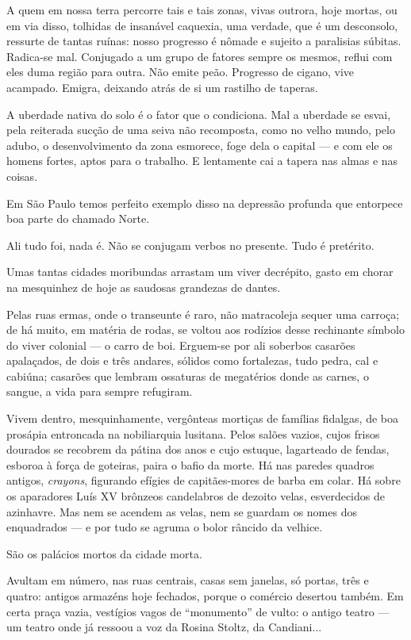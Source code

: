 A quem em nossa terra percorre tais e tais zonas, vivas outrora, hoje
mortas, ou em via disso, tolhidas de insanável caquexia, uma verdade,
que é um desconsolo, ressurte de tantas ruínas: nosso progresso é nômade
e sujeito a paralisias súbitas. Radica-se mal. Conjugado a um grupo de
fatores sempre os mesmos, reflui com eles duma região para outra. Não
emite peão. Progresso de cigano, vive acampado. Emigra, deixando atrás
de si um rastilho de taperas.

A uberdade nativa do solo é o fator que o condiciona. Mal a uberdade se
esvai, pela reiterada sucção de uma seiva não recomposta, como no velho
mundo, pelo adubo, o desenvolvimento da zona esmorece, foge dela o
capital --- e com ele os homens fortes, aptos para o trabalho. E
lentamente cai a tapera nas almas e nas coisas.

Em São Paulo temos perfeito exemplo disso na depressão profunda que
entorpece boa parte do chamado Norte.

Ali tudo foi, nada é. Não se conjugam verbos no presente. Tudo é
pretérito.

Umas tantas cidades moribundas arrastam um viver decrépito, gasto em
chorar na mesquinhez de hoje as saudosas grandezas de dantes.

Pelas ruas ermas, onde o transeunte é raro, não matracoleja sequer uma
carroça; de há muito, em matéria de rodas, se voltou aos rodízios desse
rechinante símbolo do viver colonial --- o carro de boi. Erguem-se por
ali soberbos casarões apalaçados, de dois e três andares, sólidos como
fortalezas, tudo pedra, cal e cabiúna; casarões que lembram ossaturas de
megatérios donde as carnes, o sangue, a vida para sempre refugiram.

Vivem dentro, mesquinhamente, vergônteas mortiças de famílias fidalgas,
de boa prosápia entroncada na nobiliarquia lusitana. Pelos salões
vazios, cujos frisos dourados se recobrem da pátina dos anos e cujo
estuque, lagarteado de fendas, esboroa à força de goteiras, paira o
bafio da morte. Há nas paredes quadros antigos, \emph{crayons},
figurando efígies de capitães-mores de barba em colar. Há sobre os
aparadores Luís XV brônzeos candelabros de dezoito velas, esverdecidos
de azinhavre. Mas nem se acendem as velas, nem se guardam os nomes dos
enquadrados --- e por tudo se agruma o bolor râncido da velhice.

São os palácios mortos da cidade morta.

Avultam em número, nas ruas centrais, casas sem janelas, só portas, três
e quatro: antigos armazéns hoje fechados, porque o comércio desertou
também. Em certa praça vazia, vestígios vagos de ``monumento'' de vulto:
o antigo teatro --- um teatro onde já ressoou a voz da Rosina Stoltz, da
Candiani...

